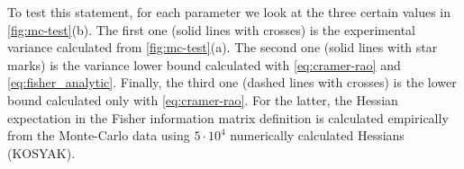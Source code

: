 \documentclass[%
 aip,
 draft,
 amsmath,amssymb,
 reprint,%
]{revtex4-1}
\begin{document}
To test this statement, for each parameter we look at the three certain values in \autoref{fig:mc-test}(b). The first one (solid lines with crosses) is the experimental variance calculated from \autoref{fig:mc-test}(a). The second one (solid lines with star marks) is the variance lower bound calculated with \eqref{eq:cramer-rao} and \eqref{eq:fisher_analytic}. Finally, the third one (dashed lines with crosses) is the lower bound calculated only with \eqref{eq:cramer-rao}. For the latter, the Hessian expectation in the Fisher information matrix definition is calculated empirically from the Monte-Carlo data using $5\cdot 10^4$ numerically calculated Hessians (KOSYAK).

\end{document}
